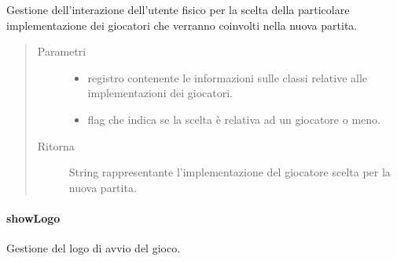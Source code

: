 \documentclass[letterpaper,10pt,italian]{sphinxmanual}
\begin{document}
\begin{fulllineitems}
\label{\detokenize{source/it/unicam/cs/pa/mastermind/ui/StartView:it.unicam.cs.pa.mastermind.ui.StartView.getPlayerName(PlayerFactoryRegistry, boolean)}}
Gestione dell’interazione dell’utente fisico per la scelta della particolare implementazione dei giocatori che verranno coinvolti nella nuova partita.
\begin{quote}\begin{description}
\item[{Parametri}] \leavevmode\begin{itemize}
\item {} 
 \textendash{} registro contenente le informazioni sulle classi  relative alle implementazioni dei giocatori.

\item {} 
 \textendash{} flag che indica se la scelta è relativa ad un giocatore  o meno.

\end{itemize}

\item[{Ritorna}] \leavevmode
String rappresentante l’implementazione del giocatore scelta per la nuova partita.

\end{description}\end{quote}

\end{fulllineitems}



\paragraph{showLogo}
\label{\detokenize{source/it/unicam/cs/pa/mastermind/ui/StartView:showlogo}}

\begin{fulllineitems}
\label{\detokenize{source/it/unicam/cs/pa/mastermind/ui/StartView:it.unicam.cs.pa.mastermind.ui.StartView.showLogo()}}
Gestione del logo di avvio del gioco.

\end{fulllineitems}
\end{document}
